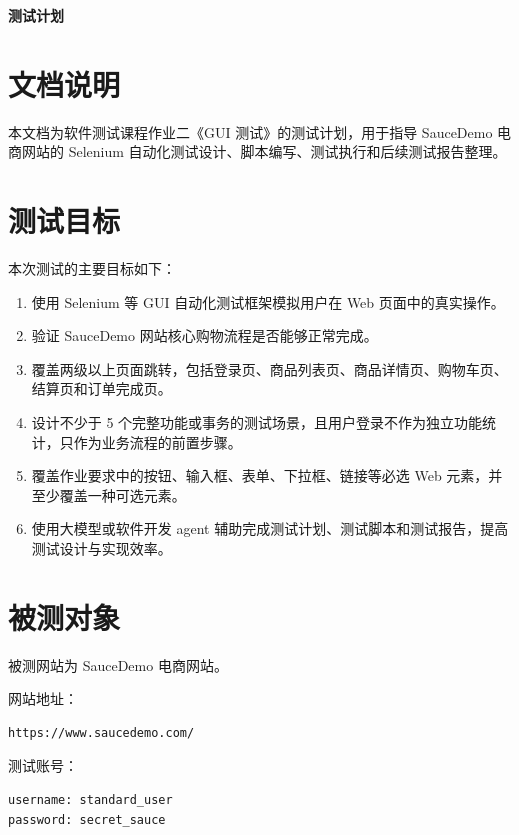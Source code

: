 \documentclass[UTF8,a4paper,12pt]{ctexart}
\begin{document}
\begin{center}
  {\LARGE\bfseries 测试计划}
\end{center}
\thispagestyle{empty}
\vspace{1em}
\tableofcontents
\newpage

\section{文档说明}

本文档为软件测试课程作业二《GUI 测试》的测试计划，用于指导 SauceDemo 电商网站的 Selenium 自动化测试设计、脚本编写、测试执行和后续测试报告整理。

\section{测试目标}

本次测试的主要目标如下：

\begin{enumerate}
  \item 使用 Selenium 等 GUI 自动化测试框架模拟用户在 Web 页面中的真实操作。
  \item 验证 SauceDemo 网站核心购物流程是否能够正常完成。
  \item 覆盖两级以上页面跳转，包括登录页、商品列表页、商品详情页、购物车页、结算页和订单完成页。
  \item 设计不少于 5 个完整功能或事务的测试场景，且用户登录不作为独立功能统计，只作为业务流程的前置步骤。
  \item 覆盖作业要求中的按钮、输入框、表单、下拉框、链接等必选 Web 元素，并至少覆盖一种可选元素。
  \item 使用大模型或软件开发 agent 辅助完成测试计划、测试脚本和测试报告，提高测试设计与实现效率。
\end{enumerate}

\section{被测对象}

被测网站为 SauceDemo 电商网站。

网站地址：

\begin{lstlisting}
https://www.saucedemo.com/
\end{lstlisting}

测试账号：

\begin{lstlisting}
username: standard_user
password: secret_sauce
\end{lstlisting}
\end{document}
